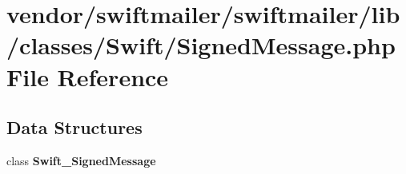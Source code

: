 \section{vendor/swiftmailer/swiftmailer/lib/classes/\+Swift/\+Signed\+Message.php File Reference}
\label{_signed_message_8php}
\subsection*{Data Structures}
\begin{DoxyCompactItemize}
\item 
class {\bf Swift\+\_\+\+Signed\+Message}
\end{DoxyCompactItemize}
